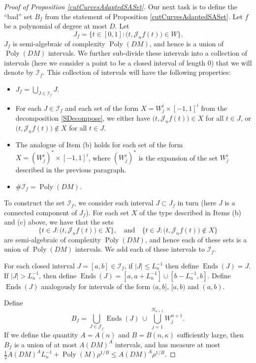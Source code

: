 \documentclass[letterpaper, reqno,11pt]{article}
\numberwithin{equation}{section}
\newcommand{\poly}{\operatorname{Poly}}
\numberwithin{thm}{section}
\theoremstyle{remark}
\begin{document}
\begin{proof}[Proof of Proposition \ref{cutCurvesAdaptedSASet}]
Our next task is to define the ``bad'' set $B_f$ from the statement of Proposition \ref{cutCurvesAdaptedSASet}. Let $f$ be a polynomial of degree at most $D$. Let 
\[
J_f=\big\{t\in [0,1]\colon \big(t, \mathcal{J}_n f(t)\big)\in W\big\}.
\]
$J_f$ is semi-algebraic of complexity $\poly(DM)$, and hence is a union of $\poly(DM)$ intervals. We further sub-divide these intervals into a collection of intervals (here we consider a point to be a closed interval of length 0) that we will denote by $\mathcal{I}_f$. This collection of intervals will have the following properties:
\begin{itemize}
	\item[(a)] $J_f = \bigcup_{J\in \mathcal{I}_f}J$. 
	\item[(b)] For each $J\in \mathcal{I}_f$ and each set of the form $X = W^i_j \times [-1,1]^{i}$ from the decomposition \eqref{SDecompose}, we either have $\big(t, \mathcal{J}_n f(t)\big)\in X$ for all $t\in J$, or $\big(t, \mathcal{J}_n f(t)\big)\not\in X$ for all $t\in J$. 
	\item[(c)] The analogue of Item (b) holds for each set of the form $X = (W^i_j)^* \times [-1,1]^{i}$, where $(W^i_j)^*$ is the expansion of the set $W^i_j$ described in the previous paragraph.
	\item[(d)]  $\#\mathcal{I}_f=\poly(DM)$.
\end{itemize}
To construct the set $\mathcal{I}_f$, we consider each interval $J\subset J_f$ in turn (here $J$ is a connected component of $J_f$). For each set $X$ of the type described in Items (b) and (c) above, we have that the sets 
\[
\big\{t\in J\colon \big(t, \mathcal{J}_n f(t)\big)\in X\big\},\quad \textrm{and}\quad \big\{t\in J\colon \big(t, \mathcal{J}_n f(t)\big)\not\in X\big\} 
\]
are semi-algebraic of complexity $\poly(DM)$, and hence each of these sets is a union of $\poly(DM)$ intervals. We add each of these intervals to $\mathcal{I}_f$.

For each closed interval $J=[a,b]\in \mathcal{I}_f$, if $|J|\leq L_n^{-1}$ then define $\operatorname{Ends}(J)=J$. If $|J|> L_n^{-1}$, then define $\operatorname{Ends}(J)=[a, a+L_n^{-1}] \cup [b-L_n^{-1}, b]$. Define $\operatorname{Ends}(J)$ analogously for intervals of the form $(a, b]$, $[a, b)$ and $(a,b)$. 

Define 
\[
B_f=\bigcup_{J\in\mathcal{J}_f}\operatorname{Ends}(J)\ \cup\ \bigcup_{j=1}^{N_{n+1}}W_j^{n+1}.
\]
If we define the quantity $A=A(n)$ and $B = B(n,\kappa)$ sufficiently large, then $B_f$ is a union of at most $A(DM)^A$ intervals, and has measure at most $\frac{1}{2} A(DM)^AL_n^{-1}+\poly(M)\rho^{1/B} \leq A(DM)^A\rho^{1/B}$.



\end{proof}
\end{document}
